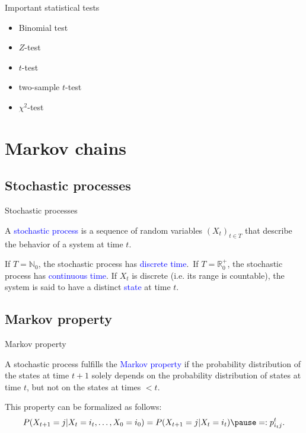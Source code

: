 \documentclass{beamer}
\def\spadding{\vspace{0.25cm}}
\def\b{\textcolor{blue}}
\begin{document}
\begin{frame}
    \begin{block}{Important statistical tests}\pause
        \begin{itemize}
            \item Binomial test\pause
            \item $Z$-test\pause
            \item $t$-test\pause
            \item two-sample $t$-test\pause
            \item $\chi^2$-test
        \end{itemize}
    \end{block}
\end{frame}

\section{Markov chains}
\subsection{Stochastic processes}
\begin{frame}{Stochastic processes}
    \begin{definition}
        A \b{stochastic process} is a sequence of random variables $(X_t)_{t \in T}$ that describe the behavior of a system at time $t$.\pause\par\spadding
        If $T = \mathbb{N}_0$, the stochastic process has \b{discrete time}.\pause\ If $T = \mathbb{R}_0^+$, the stochastic process has \b{continuous time}.
        If $X_t$ is discrete (i.e. its range is countable), the system is said to have a distinct \b{state} at time $t$.
    \end{definition}
\end{frame}

\subsection{Markov property}
\begin{frame}{Markov property}
    \begin{definition}
        A stochastic process fulfills the \b{Markov property} if the probability distribution of the states at time $t + 1$ solely depends on the probability distribution of states at time $t$, but not on the states at times $< t$.\pause\par\spadding
        This property can be formalized as follows:
        \begin{align*}
            P(X_{t+1} = j | X_t = i_t, \dots, X_0 = i_0) = P(X_{t+1} = j | X_t = i_t)\pause =: p_{i_t j}^t.
        \end{align*}
    \end{definition}
\end{frame}
\end{document}
